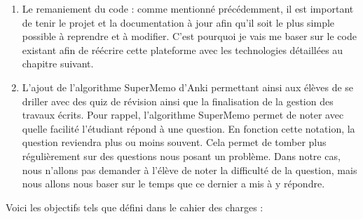 \begin{enumerate}
    \item Le remaniement du code : comme mentionné précédemment, il est important de tenir le projet et la documentation à jour afin qu'il soit le plus simple possible à reprendre et à modifier. C'est pourquoi je vais me baser sur le code existant afin de réécrire cette plateforme avec les technologies détaillées au chapitre suivant.
    \item L'ajout de l'algorithme SuperMemo d'Anki permettant ainsi aux élèves de se driller avec des quiz de révision ainsi que la finalisation de la gestion des travaux écrits. Pour rappel, l'algorithme SuperMemo permet de noter avec quelle facilité l'étudiant répond à une question. En fonction cette notation, la question reviendra plus ou moins souvent. Cela permet de tomber plus régulièrement sur des questions nous posant un problème. Dans notre cas, nous n'allons pas demander à l'élève de noter la difficulté de la question, mais nous allons nous baser sur le temps que ce dernier a mis à y répondre.
\end{enumerate}

\newpage

Voici les objectifs tels que défini dans le cahier des charges :

